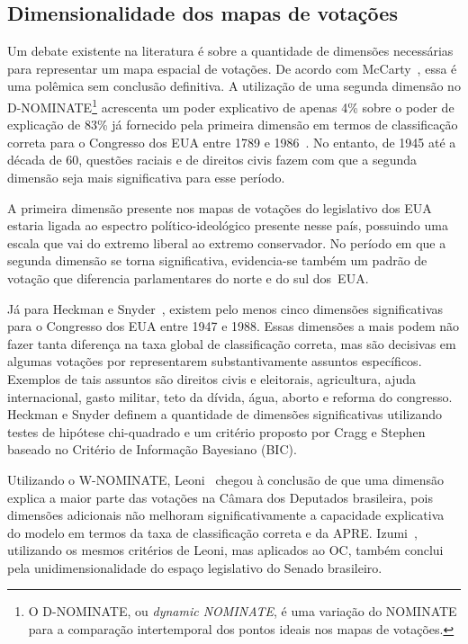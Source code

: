 \documentclass[
	article,			%
	12pt,				%
	oneside,			%
	a4paper,			%
	english,			%
	brazil,				%
	sumario=tradicional,
	oldfontcommands %
	]{abntex2}
\newcommand\nominate{NOMINATE\xspace}
\begin{document}
\subsection{Dimensionalidade dos mapas de votações}

Um debate existente na literatura é sobre a quantidade de dimensões necessárias para representar um mapa espacial de votações. De acordo com McCarty~\cite{mccarty2011measuring}, essa é uma polêmica sem conclusão definitiva.
A utilização de uma segunda dimensão no D-NOMINATE\footnote{O D-NOMINATE, ou \emph{dynamic \nominate}, é uma variação do \nominate para a comparação intertemporal dos pontos ideais nos mapas de votações.} acrescenta um poder explicativo de apenas 4\% sobre o poder de explicação de 83\% já fornecido pela primeira dimensão em termos de classificação correta para o Congresso dos EUA entre 1789 e 1986~\cite{mccarty2011measuring}. No entanto, de 1945 até a década de 60, questões raciais e de direitos civis fazem com que a segunda dimensão seja mais significativa para esse período. 

A primeira dimensão presente nos mapas de votações do legislativo dos EUA estaria ligada ao espectro político-ideológico presente nesse país, possuindo uma escala que vai do extremo liberal ao extremo conservador. No período em que a segunda dimensão se torna significativa, evidencia-se também um padrão de votação que diferencia parlamentares do norte e do sul dos~EUA.  

Já para Heckman e Snyder~\cite{heckman-snyder1997}, existem pelo menos cinco dimensões significativas para o Congresso dos EUA entre 1947 e 1988. Essas dimensões a mais podem não fazer tanta diferença na taxa global de classificação correta, mas são decisivas em algumas votações por representarem substantivamente assuntos específicos. Exemplos de tais assuntos são direitos civis e eleitorais, agricultura, ajuda internacional, gasto militar, teto da dívida, água, aborto e reforma do congresso. Heckman e Snyder definem a quantidade de dimensões significativas utilizando testes de hipótese chi-quadrado e um critério proposto por Cragg e Stephen~\cite{cragg1995factor} baseado no Critério de Informação Bayesiano (BIC). 

Utilizando o W-NOMINATE, Leoni~\cite{leoni02cdep} chegou à conclusão de que uma dimensão explica a maior parte das votações na Câmara dos Deputados brasileira, pois dimensões adicionais não melhoram significativamente a capacidade explicativa do modelo em termos da taxa de classificação correta e da APRE. Izumi~\cite{izumi2016senado}, utilizando os mesmos critérios de Leoni, mas aplicados ao OC, também conclui pela unidimensionalidade do espaço legislativo do Senado brasileiro.
\end{document}
